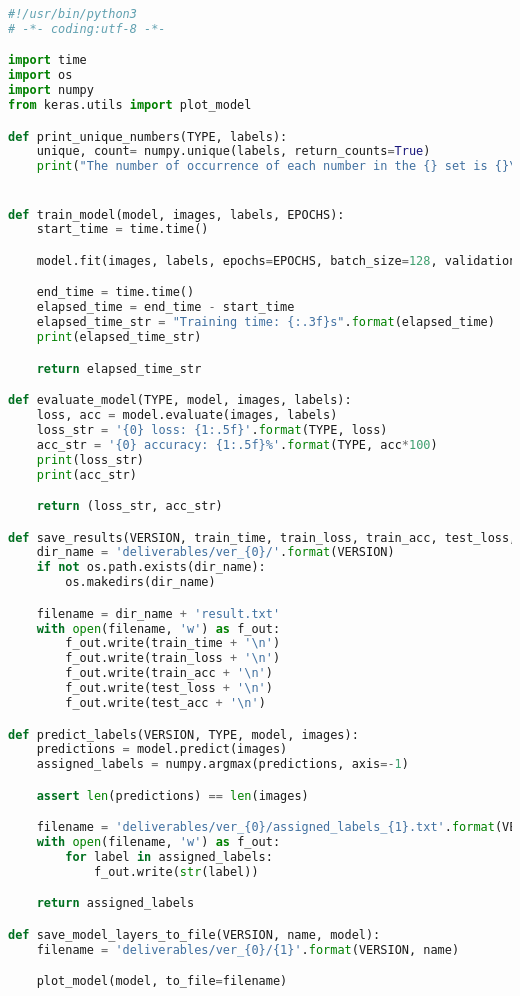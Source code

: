 \begin{lstlisting}[language=python]
#!/usr/bin/python3
# -*- coding:utf-8 -*-

import time
import os
import numpy
from keras.utils import plot_model

def print_unique_numbers(TYPE, labels):
    unique, count= numpy.unique(labels, return_counts=True)
    print("The number of occurrence of each number in the {} set is {}\n".format(TYPE, dict (zip(unique, count))))


def train_model(model, images, labels, EPOCHS):
    start_time = time.time()

    model.fit(images, labels, epochs=EPOCHS, batch_size=128, validation_data=(images, labels))

    end_time = time.time()
    elapsed_time = end_time - start_time
    elapsed_time_str = "Training time: {:.3f}s".format(elapsed_time)
    print(elapsed_time_str)

    return elapsed_time_str

def evaluate_model(TYPE, model, images, labels):
    loss, acc = model.evaluate(images, labels)
    loss_str = '{0} loss: {1:.5f}'.format(TYPE, loss)
    acc_str = '{0} accuracy: {1:.5f}%'.format(TYPE, acc*100)
    print(loss_str)
    print(acc_str)

    return (loss_str, acc_str)

def save_results(VERSION, train_time, train_loss, train_acc, test_loss, test_acc):
    dir_name = 'deliverables/ver_{0}/'.format(VERSION)
    if not os.path.exists(dir_name):
        os.makedirs(dir_name)

    filename = dir_name + 'result.txt'
    with open(filename, 'w') as f_out:
        f_out.write(train_time + '\n')
        f_out.write(train_loss + '\n')
        f_out.write(train_acc + '\n')
        f_out.write(test_loss + '\n')
        f_out.write(test_acc + '\n')

def predict_labels(VERSION, TYPE, model, images):
    predictions = model.predict(images)
    assigned_labels = numpy.argmax(predictions, axis=-1)

    assert len(predictions) == len(images)

    filename = 'deliverables/ver_{0}/assigned_labels_{1}.txt'.format(VERSION, TYPE)
    with open(filename, 'w') as f_out:
        for label in assigned_labels:
            f_out.write(str(label))

    return assigned_labels

def save_model_layers_to_file(VERSION, name, model):
    filename = 'deliverables/ver_{0}/{1}'.format(VERSION, name)

    plot_model(model, to_file=filename)
\end{lstlisting}



